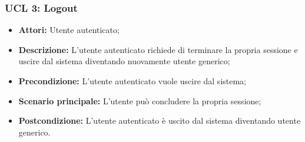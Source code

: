 \subsubsection{UCL 3: Logout}
\begin{itemize}
	\item \textbf{Attori:} Utente autenticato;
	\item \textbf{Descrizione:} L'utente autenticato richiede di terminare la propria sessione e uscire dal sistema diventando nuovamente utente generico;
	\item \textbf{Precondizione:} L'utente autenticato vuole uscire dal sistema;
	\item \textbf{Scenario principale:} L'utente può concludere la propria sessione;
	\item \textbf{Postcondizione:} L'utente autenticato è uscito dal sistema diventando utente generico.
\end{itemize}